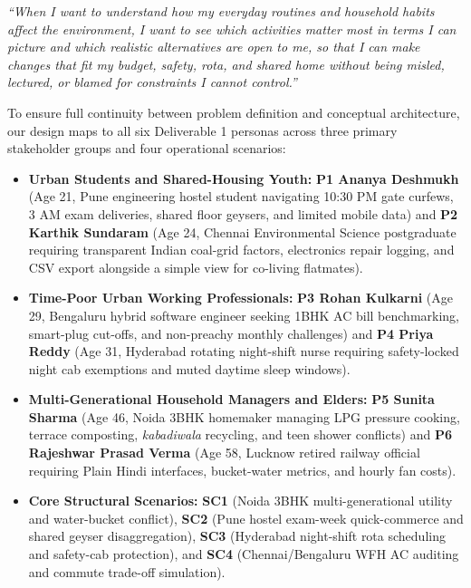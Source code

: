 \documentclass[12pt, a4paper]{article}
\begin{document}
\begin{tcolorbox}[colback=BgLight, colframe=AcademicNavy, boxrule=0.7pt, arc=2pt, left=10pt, right=10pt, top=6pt, bottom=6pt]
\textit{``When I want to understand how my everyday routines and household habits affect the environment, I want to see which activities matter most in terms I can picture and which realistic alternatives are open to me, so that I can make changes that fit my budget, safety, rota, and shared home without being misled, lectured, or blamed for constraints I cannot control.''}
\end{tcolorbox}

To ensure full continuity between problem definition and conceptual architecture, our design maps to all six Deliverable 1 personas across three primary stakeholder groups and four operational scenarios:
\begin{itemize}
    \item \textbf{Urban Students and Shared-Housing Youth:} \textbf{P1 Ananya Deshmukh} (Age 21, Pune engineering hostel student navigating 10:30 PM gate curfews, 3 AM exam deliveries, shared floor geysers, and limited mobile data) and \textbf{P2 Karthik Sundaram} (Age 24, Chennai Environmental Science postgraduate requiring transparent Indian coal-grid factors, electronics repair logging, and CSV export alongside a simple view for co-living flatmates).
    \item \textbf{Time-Poor Urban Working Professionals:} \textbf{P3 Rohan Kulkarni} (Age 29, Bengaluru hybrid software engineer seeking 1BHK AC bill benchmarking, smart-plug cut-offs, and non-preachy monthly challenges) and \textbf{P4 Priya Reddy} (Age 31, Hyderabad rotating night-shift nurse requiring safety-locked night cab exemptions and muted daytime sleep windows).
    \item \textbf{Multi-Generational Household Managers and Elders:} \textbf{P5 Sunita Sharma} (Age 46, Noida 3BHK homemaker managing LPG pressure cooking, terrace composting, \textit{kabadiwala} recycling, and teen shower conflicts) and \textbf{P6 Rajeshwar Prasad Verma} (Age 58, Lucknow retired railway official requiring Plain Hindi interfaces, bucket-water metrics, and hourly fan costs).
    \item \textbf{Core Structural Scenarios:} \textbf{SC1} (Noida 3BHK multi-generational utility and water-bucket conflict), \textbf{SC2} (Pune hostel exam-week quick-commerce and shared geyser disaggregation), \textbf{SC3} (Hyderabad night-shift rota scheduling and safety-cab protection), and \textbf{SC4} (Chennai/Bengaluru WFH AC auditing and commute trade-off simulation).
\end{itemize}
\end{document}
